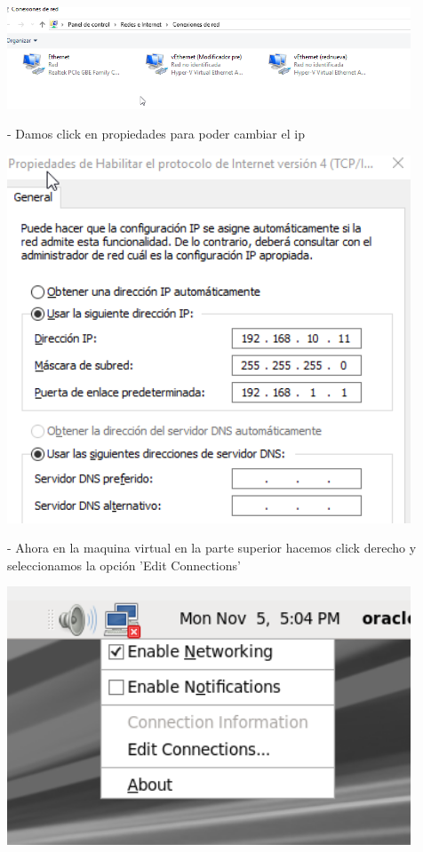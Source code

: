 \documentclass[12pt,letterpaper]{article}
\begin{document}
\begin{center}
	\includegraphics[width=12cm]{./Imagenes/15} 
\end{center}



\begin{itemize}
- Damos click en propiedades para poder cambiar el ip\\
\end{itemize}

\begin{center}
	\includegraphics[width=12cm]{./Imagenes/16} 
\end{center}



\begin{itemize}
- Ahora en la maquina virtual en la parte superior hacemos click derecho y seleccionamos la opción 'Edit Connections'\\
\end{itemize}

\begin{center}
	\includegraphics[width=12cm]{./Imagenes/17} 
\end{center}
\end{document}
